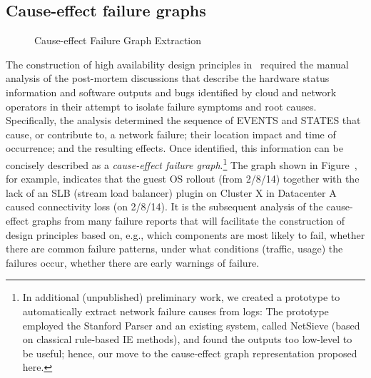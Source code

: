 \subsection{Cause-effect failure graphs}

\begin{wrapfigure}{r}{0.65\textwidth}
  \caption{Cause-effect Failure Graph Extraction}
  \label{fig:cause-effect}
\end{wrapfigure}

The construction of high availability design principles
in~\cite{rameshgoogle} required the manual analysis of the
post-mortem {\sc discussion}s that describe the hardware status
information and software outputs and bugs identified by cloud and
network operators in their attempt to isolate failure symptoms and
root causes.  Specifically, the analysis determined the sequence of
EVENTS and STATES that {\sc cause}, or contribute to, a network
failure; their {\sc location impact} and {\sc time} of occurrence; and
the {\sc resulting effect}s.  Once identified, this information can be
concisely described as a {\it cause-effect failure graph}.\footnote{In
  additional (unpublished) preliminary work, we created a prototype to
  automatically extract network failure {\sc causes} from logs: The
  prototype employed the Stanford Parser \cite{klein-manning:2003:ACL}
  and an existing system, called NetSieve \cite{netseive:2013:nsdi}
  (based on classical rule-based IE methods), and found the outputs
  too low-level to be useful; hence, our move to the cause-effect
  graph representation proposed here.} The graph shown in
Figure~\cite{fig:cause-effect}, for example, indicates that the guest
OS rollout (from 2/8/14) together with the lack of an SLB (stream load
balancer) plugin on Cluster X in Datacenter A caused connectivity loss
(on 2/8/14).
%
It is the subsequent analysis of the cause-effect graphs from many
failure reports that will facilitate the construction of design
principles based on, e.g., which components are most likely to fail,
whether there are common failure patterns, under what conditions
(traffic, usage) the failures occur, whether there are early warnings
of failure.

